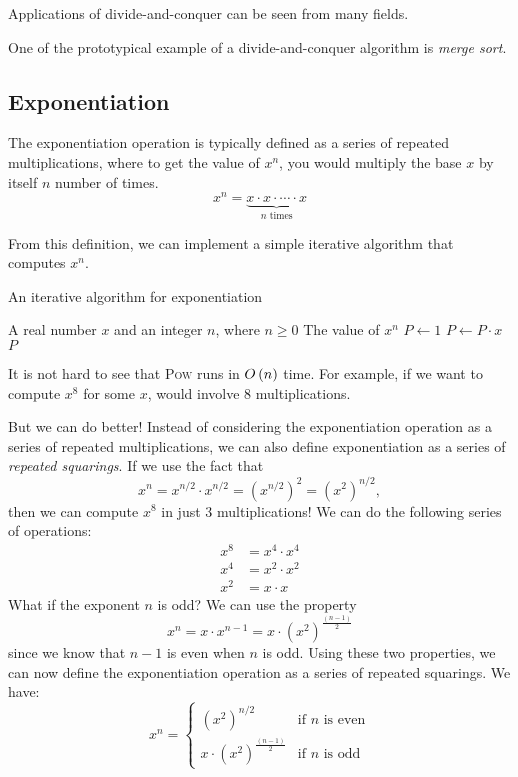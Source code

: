 Applications of divide-and-conquer can be seen from many fields. 

One of the prototypical example of a divide-and-conquer algorithm is \textit{merge sort}.

\subsection{Exponentiation}
The exponentiation operation is typically defined as a series of repeated multiplications, where to get the value of $x^n$, you would multiply the base $x$ by itself $n$ number of times.
\[
x^n = \underbrace{x \cdot x \cdot \cdots \cdot x}_{\text{$n$ times}}
\]

From this definition, we can implement a simple iterative algorithm that computes $x^n$.
\begin{algorithm}[H]
    \caption{An iterative algorithm for exponentiation}
    \begin{algorithmic}[1]
    \Require A real number $x$ and an integer $n$, where $n \ge 0$
    \Ensure The value of $x^n$
    \State $P \gets 1$
        \State $P \gets P \cdot x$
    \EndFor
    \Return $P$
    \EndFunction
    \end{algorithmic}
\end{algorithm}

It is not hard to see that \textsc{Pow} runs in $O\left(n \right)$ time. For example, if we want to compute $x^8$ for some $x$,  would involve $8$ multiplications.

But we can do better! Instead of considering the exponentiation operation as a series of repeated multiplications, we can also define exponentiation as a series of \textit{repeated squarings}. If we use the fact that
\[
    x^n = x^{n/2} \cdot x^{n/2} = \left(x^{n/2}\right)^2 = \left(x^2\right)^{n/2},
\]
then we can compute $x^8$ in just $3$ multiplications! We can do the following series of operations:
\begin{align*}
    x^8 &= x^4 \cdot x^4 \\
    x^4 &= x^2 \cdot x^2 \\
    x^2 &= x \cdot x
\end{align*}
What if the exponent $n$ is odd? We can use the property
\[
    x^n = x \cdot x^{n-1} = x \cdot \left(x^2\right)^{\frac{\left(n-1\right)}{2}}
\]
since we know that $n-1$ is even when $n$ is odd. Using these two properties, we can now define the exponentiation operation as a series of repeated squarings. We have:
\[
x^n = \begin{cases}
    \left(x^2\right)^{n/2} & \text{if $n$ is even} \\
    x \cdot \left(x^2\right)^{\frac{\left(n-1\right)}{2}} & \text{if $n$ is odd}
\end{cases}
\]

